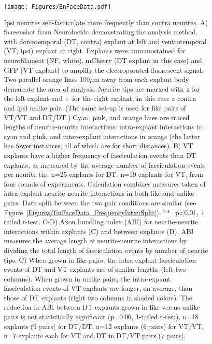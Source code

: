 \begin{figure}[hbtp]
    \begin{center}
        \texttt{[image: Figures/EnFaceData.pdf]}
        \caption[Ipsi neurites self-fasciculate more frequently than contra neurites.]
        {Ipsi neurites self-fasciculate more frequently than contra neurites.
        A) Screenshot from Neurolucida demonstrating the analysis method, with dorsotemporal (DT, contra) explant at left and ventrotemporal (VT, ipsi) explant at right.
        Explants were immunostained for neurofilament (NF, white), mCherry (DT explant in this case) and GFP (VT explant) to amplify the electroporated fluorescent signal.
        Two parallel orange lines 100$\mu$m away from each explant body demarcate the area of analysis.
        Neurite tips are marked with x for the left explant and + for the right explant, in this case a contra and ipsi unlike pair.
        (The same set-up is used for like pairs of VT/VT and DT/DT.)
        Cyan, pink, and orange lines are traced lengths of neurite-neurite interactions: intra-explant interactions in cyan and pink, and inter-explant interactions in orange (the latter has fewer instances, all of which are for short distances).
        B) VT explants have a higher frequency of fasciculation events than DT explants, as measured by the average number of fasciculation events per neurite tip.
        n=25 explants for DT, n=19 explants for VT, from four rounds of experiments.
        Calculation combines measures taken of intra-explant neurite-neurite interactions in both like and unlike pairs.
        Data split between the two pair conditions are similar (see Figure~\ref{Figures/EnFaceData_FrequencyIntxnSplit}).
        **=p<0.01, 1 tailed t-test.
        C-D) Axon bundling index (ABI) for neurite-neurite interactions within explants (C) and between explants (D).
        ABI measures the average length of neurite-neurite interactions by dividing the total length of fasciculation events by number of neurite tips.
        C) When grown in like pairs, the intra-explant fasciculation events of DT and VT explants are of similar lengths (left two columns).
        When grown in unlike pairs, the intra-explant fasciculation events of VT explants are longer, on average, than those of DT explants (right two columns in shaded colors).
        The reduction in ABI between DT explants grown in like versus unlike pairs is not statistically significant (p=0.06, 1-tailed t-test).
        n=18 explants (9 pairs) for DT/DT, n=12 explants (6 pairs) for VT/VT, n=7 explants each for VT and DT in DT/VT pairs (7 pairs).
}
\end{center}
\end{figure}
